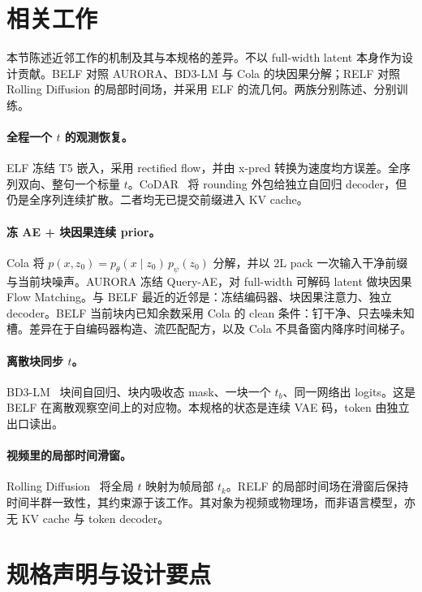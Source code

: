 \documentclass[UTF8,a4paper,11pt]{ctexart}
\begin{document}
\section{相关工作}

本节陈述近邻工作的机制及其与本规格的差异。不以 full-width latent 本身作为设计贡献。BELF 对照 AURORA、BD3-LM 与 Cola 的块因果分解；RELF 对照 Rolling Diffusion 的局部时间场，并采用 ELF 的流几何。两族分别陈述、分别训练。

\paragraph{全程一个 \(t\) 的观测恢复。}
ELF 冻结 T5 嵌入，采用 rectified flow，并由 x-pred 转换为速度均方误差。全序列双向、整句一个标量 \(t\)。CoDAR~\cite{codar2026} 将 rounding 外包给独立自回归 decoder，但仍是全序列连续扩散。二者均无已提交前缀进入 KV cache。

\paragraph{冻 AE + 块因果连续 prior。}
Cola 将 \(p(x,z_0)=p_\theta(x\mid z_0)\,p_\psi(z_0)\) 分解，并以 2L pack 一次输入干净前缀与当前块噪声。AURORA 冻结 Query-AE，对 full-width 可解码 latent 做块因果 Flow Matching。与 BELF 最近的近邻是：冻结编码器、块因果注意力、独立 decoder。BELF 当前块内已知余数采用 Cola 的 clean 条件：钉干净、只去噪未知槽。差异在于自编码器构造、流匹配配方，以及 Cola 不具备窗内降序时间梯子。

\paragraph{离散块同步 \(t\)。}
BD3-LM~\cite{bd3lm2025} 块间自回归、块内吸收态 mask、一块一个 \(t_b\)、同一网络出 logits。这是 BELF 在离散观察空间上的对应物。本规格的状态是连续 VAE 码，token 由独立出口读出。

\paragraph{视频里的局部时间滑窗。}
Rolling Diffusion~\cite{rolling2024} 将全局 \(t\) 映射为帧局部 \(t_k\)。RELF 的局部时间场在滑窗后保持时间半群一致性，其约束源于该工作。其对象为视频或物理场，而非语言模型，亦无 KV cache 与 token decoder。

\section{规格声明与设计要点}
\end{document}
